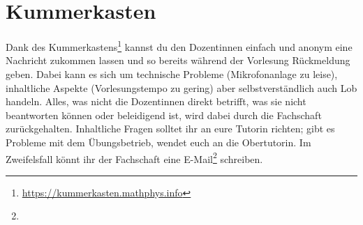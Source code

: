 \section{Kummerkasten}
\label{kummerkasten}

Dank des Kummerkastens\footnote{\url{https://kummerkasten.mathphys.info}} kannst du den Dozentinnen einfach und anonym eine Nachricht zukommen lassen und so bereits während der Vorlesung Rückmeldung geben. Dabei kann es sich um technische Probleme (Mikrofonanlage zu leise), inhaltliche Aspekte (Vorlesungstempo zu gering) aber selbstverständlich auch Lob handeln. Alles, was nicht die Dozentinnen direkt betrifft, was sie nicht beantworten können oder beleidigend ist, wird dabei durch die Fachschaft zurückgehalten. Inhaltliche Fragen solltet ihr an eure Tutorin richten; gibt es Probleme mit dem Übungsbetrieb, wendet euch an die Obertutorin. Im Zweifelsfall könnt ihr der Fachschaft eine E-Mail\footnote{} schreiben.
